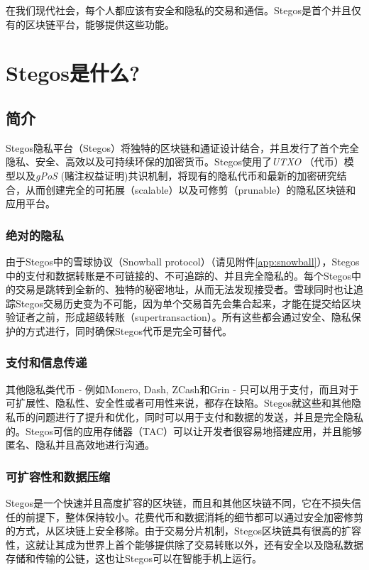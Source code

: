 \documentclass[8pt,fleqn,openany]{book}
\begin{document}
\begin{CJK*}{UTF8}{gbsn}
在我们现代社会，每个人都应该有安全和隐私的交易和通信。Stegos是首个并且仅有的区块链平台，能够提供这些功能。

\chapter{Stegos是什么?}\label{chap:what-is-stegos}

\section{简介}
Stegos隐私平台（Stegos）将独特的区块链和通证设计结合，并且发行了首个完全隐私、安全、高效以及可持续环保的加密货币。Stegos使用了\textit{UTXO} （代币）模型以及\textit{gPoS} (赌注权益证明)共识机制，将现有的隐私代币和最新的加密研究结合，从而创建完全的可拓展（scalable）以及可修剪（prunable）的隐私区块链和应用平台。

\subsection{绝对的隐私}
由于Stegos中的雪球协议（Snowball protocol）（请见附件\ref{app:snowball}），Stegos中的支付和数据转账是不可链接的、不可追踪的、并且完全隐私的。每个Stegos中的交易是跳转到全新的、独特的秘密地址，从而无法发现接受者。雪球同时也让追踪Stegos交易历史变为不可能，因为单个交易首先会集合起来，才能在提交给区块验证者之前，形成超级转账（supertransaction）。所有这些都会通过安全、隐私保护的方式进行，同时确保Stegos代币是完全可替代。

\subsection{支付和信息传递}
其他隐私类代币 - 例如Monero, Dash, ZCash和Grin - 只可以用于支付，而且对于可扩展性、隐私性、安全性或者可用性来说，都存在缺陷。Stegos就这些和其他隐私币的问题进行了提升和优化，同时可以用于支付和数据的发送，并且是完全隐私的。Stegos可信的应用存储器（TAC）可以让开发者很容易地搭建应用，并且能够匿名、隐私并且高效地进行沟通。

\subsection{可扩容性和数据压缩}
Stegos是一个快速并且高度扩容的区块链，而且和其他区块链不同，它在不损失信任的前提下，整体保持较小。花费代币和数据消耗的细节都可以通过安全加密修剪的方式，从区块链上安全移除。由于交易分片机制，Stegos区块链具有很高的扩容性，这就让其成为世界上首个能够提供除了交易转账以外，还有安全以及隐私数据存储和传输的公链，这也让Stegos可以在智能手机上运行。


\end{CJK*}
\end{document}
